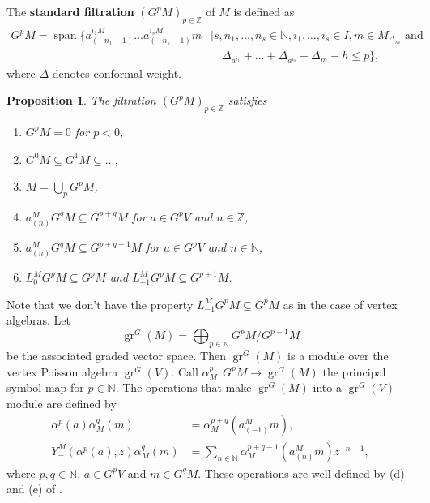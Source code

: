 \documentclass[12pt, reqno]{amsart}
\newtheorem{proposition}[theorem]{Proposition}
\theoremstyle{remark}
\DeclareMathOperator{\gr}{gr}
\DeclareMathOperator{\vspan}{span}
\begin{document}
The \textbf{standard filtration} $(G^pM)_{p \in \mathbb{Z}}$ of $M$ is defined as
\begin{equation*}
  \begin{split}
    G^pM = \vspan\{a^{i_1M}_{(-n_1 - 1)}\dots a^{i_sM}_{(-n_s - 1)}m &\mid s, n_1, \dots, n_s \in \mathbb{N}, i_1, \dots, i_s \in I, m \in M_{\Delta_m} \text{ and }\\
    &\quad \Delta_{a^{i_1}} + \dots + \Delta_{a^{i_s}} + \Delta_m - h \le p\},
  \end{split}
\end{equation*}
where $\Delta$ denotes conformal weight.

\begin{proposition}
  \label{prp:5}
  The filtration $(G^pM)_{p\in \mathbb{Z}}$ satisfies
  \begin{enumerate}[label={(\alph*)}]
  \item $G^pM = 0$ for $p < 0$,
  \item $G^0M \subseteq G^1M \subseteq \dots$,
  \item $M = \bigcup_pG^pM$,
  \item $a^M_{(n)}G^qM \subseteq G^{p + q}M$ for $a \in G^pV$ and $n \in \mathbb{Z}$,
  \item $a^M_{(n)}G^qM \subseteq G^{p + q - 1}M$ for $a \in G^pV$ and $n \in \mathbb{N}$,
  \item $L^M_0G^pM \subseteq G^pM$ and $L^M_{-1}G^pM \subseteq G^{p + 1}M$.
  \end{enumerate}
\end{proposition}

Note that we don't have the property $L_{-1}^MG^pM \subseteq G^pM$ as in the case of vertex algebras.
Let
\begin{equation*}
  \gr^G(M) = \bigoplus_{p \in \mathbb{N}}G^pM/G^{p - 1}M
\end{equation*}
be the associated graded vector space.
Then $\gr^G(M)$ is a module over the vertex Poisson algebra $\gr^G(V)$.
Call $\alpha^p_M: G^pM \to \gr^G(M)$ the principal symbol map for $p \in \mathbb{N}$.
The operations that make $\gr^G(M)$ into a $\gr^G(V)$-module are defined by
\begin{align*}
  \alpha^p(a)\alpha^q_M(m) &= \alpha^{p + q}_M(a^M_{(-1)}m), \\
  Y^M_-(\alpha^p(a), z)\alpha^q_M(m) &= \sum_{n \in \mathbb{N}}\alpha^{p + q - 1}_M(a^M_{(n)}m)z^{-n - 1},
\end{align*}
where $p, q \in \mathbb{N}$, $a \in G^pV$ and $m \in G^qM$.
These operations are well defined by (d) and (e) of .
\end{document}
